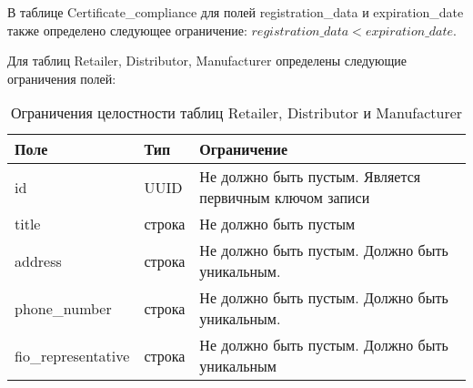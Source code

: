 В таблице Certificate\_compliance для полей registration\_data и expiration\_date также определено следующее ограничение: $ registration\_data < expiration\_date $.

\clearpage

Для таблиц Retailer, Distributor, Manufacturer определены следующие ограничения полей: 

\begin{table}[!h]
	\begin{center}
		\begin{threeparttable}
			\caption{Ограничения целостности таблиц Retailer, Distributor и Manufacturer}
			\label{tbl:entity_rdm}
			\begin{tabular}{|p{4.5cm}|p{2.5cm}|p{8.5cm}|}
				\hline 
				\textbf{Поле} & \textbf{Тип} & \textbf{Ограничение}  \\
				\hline
				id & UUID & Не должно быть пустым. Является первичным ключом записи  \\
				\hline
				title & строка & Не должно быть пустым   \\
				\hline
				address & строка & Не должно быть пустым. Должно быть уникальным.  \\
				\hline
				phone\_number & строка & Не должно быть пустым. Должно быть уникальным. \\
				\hline
				fio\_representative & строка & Не должно быть пустым. Должно быть уникальным \\
				\hline
			\end{tabular}
		\end{threeparttable}			
	\end{center}
\end{table}

